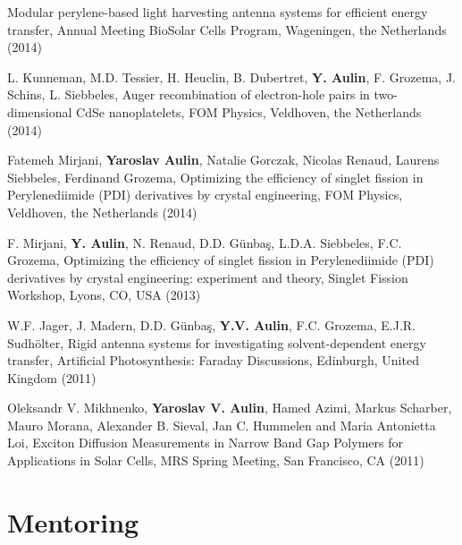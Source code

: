 \documentclass[11pt,letterpaper,sans]{moderncv} %
\begin{document}
\begin{etaremune}
             Modular perylene-based light harvesting antenna systems for efficient 
             energy transfer, Annual Meeting BioSolar Cells Program, 
             Wageningen, the Netherlands (2014)
       \item L. Kunneman, M.D. Tessier, H. Heuclin, B. Dubertret, \textbf{Y. Aulin},
             F. Grozema, J. Schins, L. Siebbeles, 
             Auger recombination of electron-hole pairs in two-dimensional 
             CdSe nanoplatelets, FOM Physics, Veldhoven, the Netherlands (2014)
       \item Fatemeh Mirjani, \textbf{Yaroslav Aulin}, Natalie Gorczak, 
             Nicolas Renaud, Laurens Siebbeles, Ferdinand Grozema, Optimizing the 
             efficiency of singlet fission in Perylenediimide (PDI) derivatives by crystal 
             engineering, FOM Physics, Veldhoven, the Netherlands (2014)
       \item F. Mirjani, \textbf{Y. Aulin}, N. Renaud, D.D. Günbaş,
             L.D.A. Siebbeles, F.C. Grozema, 
             Optimizing the efficiency of singlet fission in Perylenediimide 
             (PDI) derivatives by crystal engineering: experiment and theory,
             Singlet Fission Workshop, Lyons, CO, USA (2013)
       \item W.F. Jager, J. Madern, D.D. Günbaş, \textbf{Y.V. Aulin}, F.C. Grozema, 
             E.J.R. Sudhölter, Rigid antenna systems for investigating solvent-dependent energy
             transfer, Artificial Photosynthesis: Faraday Discussions, Edinburgh, 
             United Kingdom (2011)
       \item Oleksandr V. Mikhnenko, \textbf{Yaroslav V. Aulin}, Hamed Azimi, Markus Scharber, 
             Mauro Morana, Alexander B. Sieval, Jan C. Hummelen and Maria Antonietta Loi,
             Exciton Diffusion Measurements in Narrow Band Gap Polymers
             for Applications in Solar Cells, MRS Spring Meeting, San Francisco, CA (2011)
\end{etaremune}






\section {Mentoring}
\end{document}
